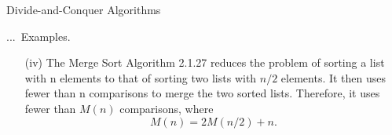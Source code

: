 \documentclass[smaller,hyperref={CJKbookmarks=true}]{beamer}
\newcommand{\N}{\mathbb{N}} \newcommand{\Z}{\mathbb{Z}} \newcommand{\Q}{\mathbb{Q}}
\newcounter{zhuo}[subsection]
\renewcommand{\thezhuo}{\thesection.\thesubsection.\arabic{zhuo}}
\newenvironment{EXAMPLES}{\stepcounter{zhuo}\alert{\!\thezhuo.~Examples.\,}}{}
\begin{document}
\begin{frame}{Divide-and-Conquer Algorithms}
\begin{spacing}{0.91}
\begin{EXAMPLES}
\begin{itemize}
      \[a=(a_{2n-1}\,...\,a_1a_0)_2,\qquad\qquad\quad
      b=(b_{2n-1}\,...\,b_1b_0)_2.\]
      Setting
      \begin{align*}
        A_0 &=(a_{n-1}\,...\,a_0)_2, & A_1 &=(a_{2n-1}\,...\,a_n)_2, \\
        B_0 &=(b_{n-1}\,...\,b_0)_2, & B_1 &=(b_{2n-1}\,...\,b_n)_2
      \end{align*}
      we can write
      \[a=2^nA_1+A_0,\qquad\qquad\quad
      b=2^nB_1+B_0.\]
\newpage
      Then
      \[a\cdot b=(2^{2n}+2^n)A_1B_1+2^n(A_1-A_0)(B_0-B_1)+(2^n+1)A_0B_0,\]
      so the multiplication of two integers of length $2n$ is reduced to summing three multiplications of integers of length $n$. The number of operations required for the multiplications by powers of 2 (shifts in the binary expansion) and addition are proportional to $n$, so the total number of operations is given by
      \[f(2n)=3f(n)+Cn\]
      for some $C\in\N$.
  \item[(iv)] The Merge Sort Algorithm 2.1.27 reduces the problem of sorting a list with n elements to that of sorting two lists with $n/2$ elements. It then uses fewer than n comparisons to merge the two sorted lists. Therefore, it uses fewer than $M(n)$ comparisons, where
      \[M(n)=2M(n/2)+n.\]
\end{itemize}
\end{EXAMPLES}
\end{spacing}
\end{frame}
\end{document}
